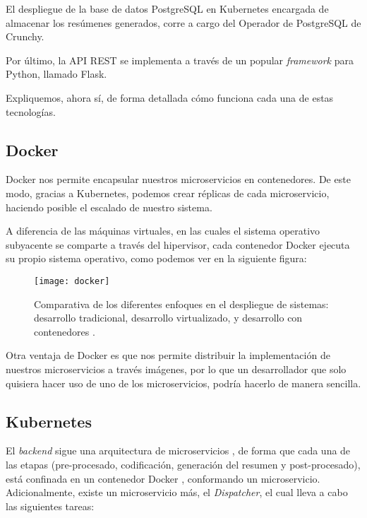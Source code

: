 El despliegue de la base de datos PostgreSQL en Kubernetes encargada de almacenar los resúmenes generados, corre a cargo del Operador de PostgreSQL de Crunchy.

Por último, la API REST se implementa a través de un popular \emph{framework} para Python, llamado Flask.

Expliquemos, ahora sí, de forma detallada cómo funciona cada una de estas tecnologías.

\subsection{Docker}

Docker nos permite encapsular nuestros microservicios en contenedores. De este modo, gracias a Kubernetes, podemos crear réplicas de cada microservicio, haciendo posible el escalado de nuestro sistema.

A diferencia de las máquinas virtuales, en las cuales el sistema operativo subyacente se comparte a través del hipervisor, cada contenedor Docker ejecuta su propio sistema operativo, como podemos ver en la siguiente figura:

\begin{figure}[!h]
	\centering
	\texttt{[image: docker]}
	\caption[Diferentes enfoques en el despliegue de sistemas.]{Comparativa de los diferentes enfoques en el despliegue de sistemas: desarrollo tradicional, desarrollo virtualizado, y desarrollo con contenedores \cite{kubernetes}.}
	\label{fig:vm-container}
\end{figure}

Otra ventaja de Docker es que nos permite distribuir la implementación de nuestros microservicios a través imágenes, por lo que un desarrollador que solo quisiera hacer uso de uno de los microservicios, podría hacerlo de manera sencilla.

\subsection{Kubernetes}

El \emph{backend} sigue una arquitectura de microservicios \cite{newman15}, de forma que cada una de las etapas (pre-procesado, codificación, generación del resumen y post-procesado), está confinada en un contenedor Docker \cite{docker}, conformando un microservicio. Adicionalmente, existe un microservicio más, el \emph{Dispatcher}, el cual lleva a cabo las siguientes tareas:

